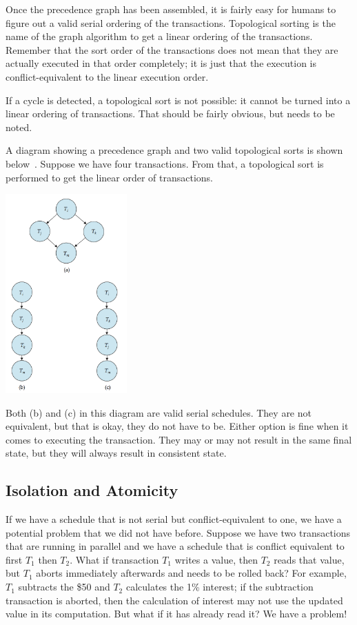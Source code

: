 Once the precedence graph has been assembled, it is fairly easy for humans to figure out a valid serial ordering of the transactions. Topological sorting is the name of the graph algorithm to get a linear ordering of the transactions. Remember that the sort order of the transactions does not mean that they are actually executed in that order completely; it is just that the execution is conflict-equivalent to the linear execution order. 

If a cycle is detected, a topological sort is not possible: it cannot be turned into a linear ordering of transactions. That should be fairly obvious, but needs to be noted.

A diagram showing a precedence graph and two valid topological sorts is shown below~\cite{dsc}. Suppose we have four transactions. From that, a topological sort is performed to get the linear order of transactions.

\begin{center}
\includegraphics[width=0.35\textwidth]{images/topological}
\end{center}

Both (b) and (c) in this diagram are valid serial schedules. They are not equivalent, but that is okay, they do not have to be. Either option is fine when it comes to executing the transaction. They may or may not result in the same final state, but they will always result in consistent state.

\subsection*{Isolation and Atomicity}

If we have a schedule that is not serial but conflict-equivalent to one, we have a potential problem that we did not have before. Suppose we have two transactions that are running in parallel and we have a schedule that is conflict equivalent to first $T_{1}$ then $T_{2}$. What if transaction $T_{1}$ writes a value, then $T_{2}$ reads that value, but $T_{1}$ aborts immediately afterwards and needs to be rolled back? For example, $T_{1}$ subtracts the \$50 and $T_{2}$ calculates the 1\% interest; if the subtraction transaction is aborted, then the calculation of interest may not use the updated value in its computation. But what if it has already read it? We have a problem!

